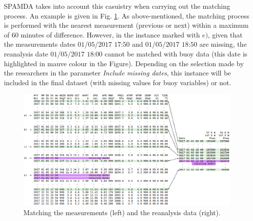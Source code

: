 \documentclass[energies,article,submit,moreauthors,pdftex]{Definitions/mdpi}
\begin{document}
		SPAMDA takes into account this casuistry when carrying out the matching process. An example is given in Fig. \ref{fig:matchingMeasurements}. As above-mentioned, the matching process is performed with the nearest measurement (previous or next) within a maximum of 60 minutes of difference. However, in the instance marked with $e)$, given that the measurements dates $01$/$05$/$2017$ $17$:$50$ and $01$/$05$/$2017$ $18$:$50$ are missing, the reanalysis date $01$/$05$/$2017$ $18$:$00$ cannot be matched with buoy data (this date is highlighted in mauve colour in the Figure). Depending on the selection made by the researchers in the parameter \textit{Include missing dates}, this instance will be included in the final dataset (with missing values for buoy variables) or not.
		
		\begin{figure}[ht!]
			\centering
			\includegraphics[scale=0.36]{figures/FigureMatchingMeasurements.png}
			\caption{Matching the measurements (left) and the reanalysis data (right).}
			\label{fig:matchingMeasurements}
		\end{figure}
		


%

\end{document}
